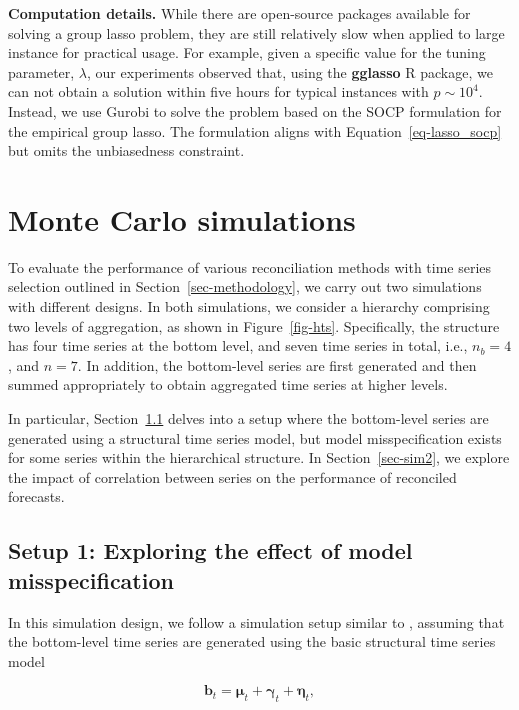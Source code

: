 \documentclass[11pt,a4paper,]{article}
\begin{document}
\textbf{Computation details.} While there are open-source packages
available for solving a group lasso problem, they are still relatively
slow when applied to large instance for practical usage. For example,
given a specific value for the tuning parameter, \(\lambda\), our
experiments observed that, using the \textbf{gglasso} R package, we can
not obtain a solution within five hours for typical instances with
\(p \sim 10^4\). Instead, we use Gurobi to solve the problem based on
the SOCP formulation for the empirical group lasso. The formulation
aligns with Equation~\ref{eq-lasso_socp} but omits the unbiasedness
constraint.

\hypertarget{sec-simulations}{%
\section{Monte Carlo simulations}\label{sec-simulations}}

To evaluate the performance of various reconciliation methods with time
series selection outlined in Section~\ref{sec-methodology}, we carry out
two simulations with different designs. In both simulations, we consider
a hierarchy comprising two levels of aggregation, as shown in
Figure~\ref{fig-hts}. Specifically, the structure has four time series
at the bottom level, and seven time series in total, i.e., \(n_b = 4\),
and \(n = 7\). In addition, the bottom-level series are first generated
and then summed appropriately to obtain aggregated time series at higher
levels.

In particular, Section~\ref{sec-sim1} delves into a setup where the
bottom-level series are generated using a structural time series model,
but model misspecification exists for some series within the
hierarchical structure. In Section~\ref{sec-sim2}, we explore the impact
of correlation between series on the performance of reconciled
forecasts.

\hypertarget{sec-sim1}{%
\subsection{Setup 1: Exploring the effect of model
misspecification}\label{sec-sim1}}

In this simulation design, we follow a simulation setup similar to
\textcite{Wickramasuriya2019-fc}, assuming that the bottom-level time
series are generated using the basic structural time series model

\[
\boldsymbol{b}_t=\boldsymbol{\mu}_t+\boldsymbol{\gamma}_t+\boldsymbol{\eta}_t,
\]
\end{document}
